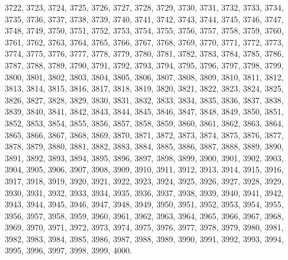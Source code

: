 \documentclass[a4paper,11pt]{article}
\numberwithin{equation}{section}
\begin{document}
3722, 3723, 3724, 3725, 3726, 3727, 3728, 3729, 3730, 3731, 3732, 3733,
3734, 3735, 3736, 3737, 3738, 3739, 3740, 3741, 3742, 3743, 3744, 3745,
3746, 3747, 3748, 3749, 3750, 3751, 3752, 3753, 3754, 3755, 3756, 3757,
3758, 3759, 3760, 3761, 3762, 3763, 3764, 3765, 3766, 3767, 3768, 3769,
3770, 3771, 3772, 3773, 3774, 3775, 3776, 3777, 3778, 3779, 3780, 3781,
3782, 3783, 3784, 3785, 3786, 3787, 3788, 3789, 3790, 3791, 3792, 3793,
3794, 3795, 3796, 3797, 3798, 3799, 3800, 3801, 3802, 3803, 3804, 3805,
3806, 3807, 3808, 3809, 3810, 3811, 3812, 3813, 3814, 3815, 3816, 3817,
3818, 3819, 3820, 3821, 3822, 3823, 3824, 3825, 3826, 3827, 3828, 3829,
3830, 3831, 3832, 3833, 3834, 3835, 3836, 3837, 3838, 3839, 3840, 3841,
3842, 3843, 3844, 3845, 3846, 3847, 3848, 3849, 3850, 3851, 3852, 3853,
3854, 3855, 3856, 3857, 3858, 3859, 3860, 3861, 3862, 3863, 3864, 3865,
3866, 3867, 3868, 3869, 3870, 3871, 3872, 3873, 3874, 3875, 3876, 3877,
3878, 3879, 3880, 3881, 3882, 3883, 3884, 3885, 3886, 3887, 3888, 3889,
3890, 3891, 3892, 3893, 3894, 3895, 3896, 3897, 3898, 3899, 3900, 3901,
3902, 3903, 3904, 3905, 3906, 3907, 3908, 3909, 3910, 3911, 3912, 3913,
3914, 3915, 3916, 3917, 3918, 3919, 3920, 3921, 3922, 3923, 3924, 3925,
3926, 3927, 3928, 3929, 3930, 3931, 3932, 3933, 3934, 3935, 3936, 3937,
3938, 3939, 3940, 3941, 3942, 3943, 3944, 3945, 3946, 3947, 3948, 3949,
3950, 3951, 3952, 3953, 3954, 3955, 3956, 3957, 3958, 3959, 3960, 3961,
3962, 3963, 3964, 3965, 3966, 3967, 3968, 3969, 3970, 3971, 3972, 3973,
3974, 3975, 3976, 3977, 3978, 3979, 3980, 3981, 3982, 3983, 3984, 3985,
3986, 3987, 3988, 3989, 3990, 3991, 3992, 3993, 3994, 3995, 3996, 3997,
3998, 3999, 4000.













{}






\end{document}
